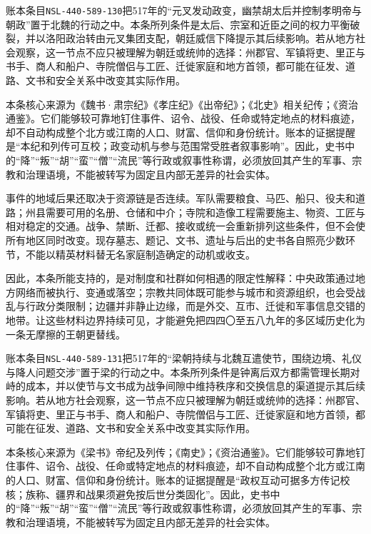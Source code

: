 账本条目\texttt{NSL-440-589-130}把517年的“元叉发动政变，幽禁胡太后并控制孝明帝与朝政”置于北魏的行动之中。本条所列条件是太后、宗室和近臣之间的权力平衡破裂，并以洛阳政治转由元叉集团支配，朝廷威信下降提示其后续影响。若从地方社会观察，这一节点不应只被理解为朝廷或统帅的选择：州郡官、军镇将吏、里正与书手、商人和船户、寺院僧侣与工匠、迁徙家庭和地方首领，都可能在征发、道路、文书和安全关系中改变其实际作用。

本条核心来源为《魏书·肃宗纪》《孝庄纪》《出帝纪》；《北史》相关纪传；《资治通鉴》。它们能够较可靠地钉住事件、诏令、战役、任命或特定地点的材料痕迹，却不自动构成整个北方或江南的人口、财富、信仰和身份统计。账本的证据提醒是“本纪和列传可互校；政变动机与参与范围常受胜者叙事影响”。因此，史书中的“降”“叛”“胡”“蛮”“僧”“流民”等行政或叙事性称谓，必须放回其产生的军事、宗教和治理语境，不能被转写为固定且内部无差异的社会实体。

事件的地域后果还取决于资源链是否连续。军队需要粮食、马匹、船只、役夫和道路；州县需要可用的名册、仓储和中介；寺院和造像工程需要施主、物资、工匠与相对稳定的交通。战争、禁断、迁都、接收或统一会重新排列这些条件，但不会使所有地区同时改变。现存墓志、题记、文书、遗址与后出的史书各自照亮少数环节，不能以精英材料替无名家庭制造确定的动机或收支。

因此，本条所能支持的，是对制度和社群如何相遇的限定性解释：中央政策通过地方网络而被执行、变通或落空；宗教共同体既可能参与城市和资源组织，也会受战乱与行政分类限制；边疆并非静止边缘，而是外交、互市、迁徙和军事信息交错的地带。让这些材料边界持续可见，才能避免把四四〇至五八九年的多区域历史化为一条无摩擦的王朝更替线。

账本条目\texttt{NSL-440-589-131}把517年的“梁朝持续与北魏互遣使节，围绕边境、礼仪与降人问题交涉”置于梁的行动之中。本条所列条件是钟离后双方都需管理长期对峙的成本，并以使节与文书成为战争间隙中维持秩序和交换信息的渠道提示其后续影响。若从地方社会观察，这一节点不应只被理解为朝廷或统帅的选择：州郡官、军镇将吏、里正与书手、商人和船户、寺院僧侣与工匠、迁徙家庭和地方首领，都可能在征发、道路、文书和安全关系中改变其实际作用。

本条核心来源为《梁书》帝纪及列传；《南史》；《资治通鉴》。它们能够较可靠地钉住事件、诏令、战役、任命或特定地点的材料痕迹，却不自动构成整个北方或江南的人口、财富、信仰和身份统计。账本的证据提醒是“政权互动可据多方传记校核；族称、疆界和战果须避免按后世分类固化”。因此，史书中的“降”“叛”“胡”“蛮”“僧”“流民”等行政或叙事性称谓，必须放回其产生的军事、宗教和治理语境，不能被转写为固定且内部无差异的社会实体。

